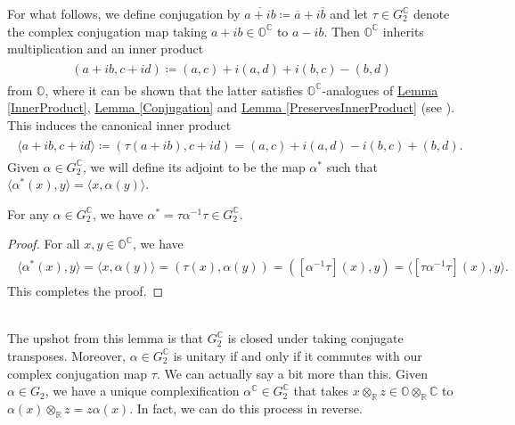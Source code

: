 \noindent For what follows, we define conjugation by $\overline{a + ib} \coloneqq \overline{a} + i\overline{b}$ and let $\tau \in G_2^\mathbb{C}$ denote the complex conjugation map taking $a + ib \in \mathbb{O}^\mathbb{C}$ to $a - ib$. Then $\mathbb{O}^\mathbb{C}$ inherits multiplication and an inner product
\begin{align*}
\begin{split}
(a + ib, c + id) \coloneqq (a, c) + i(a, d) + i(b, c) - (b, d) %
\end{split}
\end{align*}
\noindent from $\mathbb{O}$, where it can be shown that the latter satisfies $\mathbb{O}^\mathbb{C}$-analogues of \hyperref[InnerProduct]{Lemma \ref*{InnerProduct}}, \hyperref[Conjugation]{Lemma \ref*{Conjugation}} and \hyperref[PreservesInnerProduct]{Lemma \ref*{PreservesInnerProduct}} (see \cite[Lemma 1.12.1]{Yok25}). This induces the canonical inner product
\begin{align*}
\begin{split}
\langle a + ib, c + id\rangle \coloneqq (\tau(a + ib), c + id) = (a, c) + i(a, d) - i(b, c) + (b, d).
\end{split}
\end{align*}
\noindent Given $\alpha \in G_2^\mathbb{C}$, we will define its adjoint to be the map $\alpha^*$ such that $\langle \alpha^*(x), y\rangle = \langle x, \alpha(y)\rangle$.\\

\noindent\begin{lemma} For any $\alpha \in G_2^\mathbb{C}$, we have $\alpha^* = \tau\alpha^{-1}\tau \in G_2^\mathbb{C}$.\\
\end{lemma}

\noindent\begin{proof} For all $x, y \in \mathbb{O}^\mathbb{C}$, we have
\begin{align*}
\begin{split}
\langle\alpha^*(x), y\rangle = \langle x, \alpha(y)\rangle = (\tau(x), \alpha(y)) = ([\alpha^{-1}\tau](x), y) = \langle[\tau\alpha^{-1}\tau](x), y\rangle.
\end{split}
\end{align*}
\noindent This completes the proof.
\end{proof}\\

\noindent The upshot from this lemma is that $G_2^\mathbb{C}$ is closed under taking conjugate transposes. Moreover, $\alpha \in G_2^\mathbb{C}$ is unitary if and only if it commutes with our complex conjugation map $\tau$. We can actually say a bit more than this. Given $\alpha \in G_2$, we have a unique complexification $\alpha^\mathbb{C} \in G_2^\mathbb{C}$ that takes $x \otimes_\mathbb{R} z \in \mathbb{O} \otimes_\mathbb{R} \mathbb{C}$ to $\alpha(x) \otimes_\mathbb{R} z = z\alpha(x)$. In fact, we can do this process in reverse.\\


